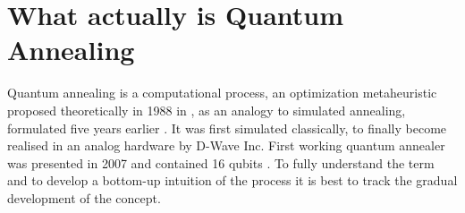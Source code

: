 \chapter{What actually is Quantum Annealing}
Quantum annealing is a computational process, an optimization metaheuristic proposed theoretically in 1988 in \cite{apolloni1988numerical}, as an analogy to simulated annealing, formulated five years earlier \cite{kirkpatrick1983optimization}. It was first simulated classically, to finally become realised in an analog hardware by D-Wave Inc. First working quantum annealer was presented in 2007 and contained 16 qubits \cite{d-wave_inc_d-wave_2007}. To fully understand the term and to develop a bottom-up intuition of the process it is best to track the gradual development of the concept.


